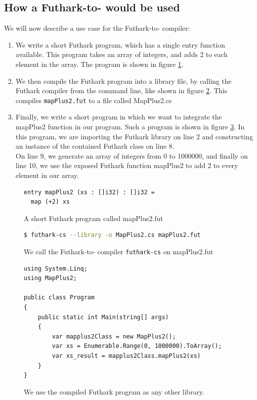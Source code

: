 \subsection*{How a Futhark-to-\csharp{} would be used}
We will now describe a use case for the Futhark-to-\csharp{} compiler:
\begin{enumerate}
\item We write a short Futhark program, which has a single entry function
  available. This program takes an array of integers, and
adds 2 to each element in the array. The program is shown in figure \ref{fig:shortfutharkprogram3}. 
\item We then compile the Futhark program into a library file, by calling the
  Futhark compiler from the command line, like shown in figure \ref{fig:shortfutharkprogram4}.
This compiles \texttt{mapPlus2.fut} to a \csharp{} file called MapPlus2.cs

\item Finally, we write a short \csharp{} program in which we want to integrate
  the mapPlus2 function in our program. Such a program is shown in figure \ref{fig:shortfutharkprogram5}.
  In this program, we are importing the Futhark library on line 2 and constructing
  an instance of the contained Futhark class on line 8.\\
  On line 9, we generate an array of integers from 0 to 1000000, and finally
  on line 10, we use the exposed Futhark function mapPlus2 to add 2 to every
  element in our array.
\end{enumerate}
\begin{figure}[H]
  \centering
  \begin{lstlisting}[language=Futhark]
entry mapPlus2 (xs : []i32) : []i32 =
  map (+2) xs
  \end{lstlisting}
  \caption{A short Futhark program called mapPlus2.fut}
  \label{fig:shortfutharkprogram3}
\end{figure}

\begin{figure}[H]
  \centering
  \begin{lstlisting}[language=sh]
$ futhark-cs --library -o MapPlus2.cs mapPlus2.fut
  \end{lstlisting}
  \caption{We call the Futhark-to-\csharp{} compiler \texttt{futhark-cs} on
    mapPlus2.fut}
  \label{fig:shortfutharkprogram4}
\end{figure}

\begin{figure}[H]
  \centering
\begin{verbatim}
using System.Linq;
using MapPlus2;

public class Program
{
    public static int Main(string[] args)
    {
        var mapplus2Class = new MapPlus2();
        var xs = Enumerable.Range(0, 1000000).ToArray();
        var xs_result = mapplus2Class.mapPlus2(xs)
    }
}
\end{verbatim}
  \caption{We use the compiled Futhark program as any other library.}
  \label{fig:shortfutharkprogram5}
\end{figure}

